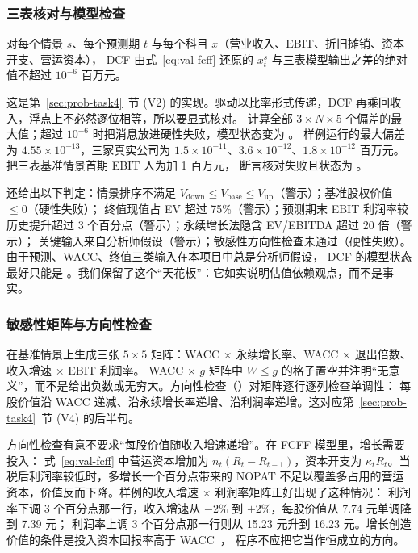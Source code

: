 \subsubsection{三表核对与模型检查}

\begin{invariant}
\label{inv:val-tie}
对每个情景 $s$、每个预测期 $t$ 与每个科目 $x$（营业收入、EBIT、折旧摊销、资本开支、营运资本），
DCF 由式~\eqref{eq:val-fcff} 还原的 $x^s_t$ 与三表模型输出之差的绝对值不超过 $10^{-6}$ 百万元。
\end{invariant}

这是第~\ref{sec:prob-task4}~节 (V2) 的实现。驱动以比率形式传递，DCF 再乘回收入，浮点上不必然逐位相等，所以要显式核对。
 计算全部 $3\times N\times5$ 个偏差的最大值；超过 $10^{-6}$ 时把消息放进硬性失败，模型状态变为 。
样例运行的最大偏差为 $4.55\times10^{-13}$，三家真实公司为 $1.5\times10^{-11}$、$3.6\times10^{-12}$、$1.8\times10^{-12}$ 百万元。
 把三表基准情景首期 EBIT 人为加 1 百万元，
断言核对失败且状态为 。

 还给出以下判定：情景排序不满足 $V_{\text{down}}\le V_{\text{base}}\le V_{\text{up}}$（警示）；基准股权价值 $\le0$（硬性失败）；
终值现值占 EV 超过 75\%（警示）；预测期末 EBIT 利润率较历史提升超过 3 个百分点（警示）；永续增长法隐含 EV/EBITDA 超过 20 倍（警示）；
关键输入来自分析师假设（警示）；敏感性方向性检查未通过（硬性失败）。由于预测、WACC、终值三类输入在本项目中总是分析师假设，
DCF 的模型状态最好只能是 。我们保留了这个“天花板”：它如实说明估值依赖观点，而不是事实。

\subsubsection{敏感性矩阵与方向性检查}

 在基准情景上生成三张 $5\times5$ 矩阵：WACC × 永续增长率、WACC × 退出倍数、收入增速 × EBIT 利润率。
WACC × $g$ 矩阵中 $W\le g$ 的格子置空并注明“无意义”，而不是给出负数或无穷大。方向性检查（）对矩阵逐行逐列检查单调性：
每股价值沿 WACC 递减、沿永续增长率递增、沿利润率递增。这对应第~\ref{sec:prob-task4}~节 (V4) 的后半句。

\begin{insight}[：收入增速不在方向性检查里]
方向性检查有意不要求“每股价值随收入增速递增”。在 FCFF 模型里，增长需要投入：
式~\eqref{eq:val-fcff} 中营运资本增加为 $n_t(R_t-R_{t-1})$，资本开支为 $\kappa_t R_t$。当税后利润率较低时，多增长一个百分点带来的 NOPAT
不足以覆盖多占用的营运资本，价值反而下降。样例的收入增速 × 利润率矩阵正好出现了这种情况：
利润率下调 3 个百分点那一行，收入增速从 $-2\%$ 到 $+2\%$，每股价值从 7.74 元单调降到 7.39 元；
利润率上调 3 个百分点那一行则从 15.23 元升到 16.23 元。增长创造价值的条件是投入资本回报率高于 WACC~\cite{koller2020valuation}，
程序不应把它当作恒成立的方向。
\end{insight}

